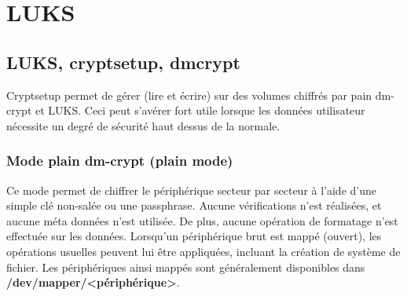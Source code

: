 
\chapter{LUKS} %

\label{Chapitre 6.1} %




\section{LUKS, cryptsetup, dmcrypt}
Cryptsetup permet de gérer (lire et écrire) sur des volumes chiffrés par pain dm-crypt et LUKS. Ceci peut s'avérer fort utile lorsque les données utilisateur nécessite un degré de sécurité haut dessus de la normale.
\subsection{Mode plain dm-crypt (plain mode)}
Ce mode permet de chiffrer le périphérique secteur par secteur à l'aide d'une simple clé non-salée ou une passphrase. Aucune vérifications n'est réalisées, et aucune méta données n'est utilisée. De plus, aucune opération de formatage n'est effectuée sur les données. Lorsqu'un périphérique brut est mappé (ouvert), les opérations usuelles peuvent lui être appliquées, incluant la création de système de fichier. Les périphériques ainsi mappés sont généralement disponibles dans \textbf{/dev/mapper/<périphérique>}.
